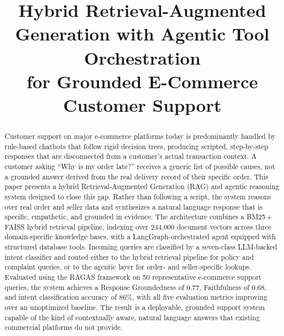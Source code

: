 \documentclass[conference]{IEEEtran}
\begin{document}
\title{Hybrid Retrieval-Augmented Generation with Agentic Tool Orchestration\\
for Grounded E-Commerce Customer Support}

\author{
\and
{}
\and
{}
}

\maketitle

\begin{abstract}
Customer support on major e-commerce platforms today is predominantly handled by
rule-based chatbots that follow rigid decision trees, producing scripted,
step-by-step responses that are disconnected from a customer's actual transaction
context. A customer asking ``Why is my order late?'' receives a generic list of
possible causes, not a grounded answer derived from the real delivery record of
their specific order. This paper presents a hybrid Retrieval-Augmented Generation
(RAG) and agentic reasoning system designed to close this gap. Rather than following
a script, the system reasons over real order and seller data and synthesizes a
natural language response that is specific, empathetic, and grounded in evidence.
The architecture combines a BM25\,+\,FAISS hybrid retrieval pipeline, indexing over
244{,}000 document vectors across three domain-specific knowledge bases, with a
LangGraph-orchestrated agent equipped with structured database tools. Incoming
queries are classified by a seven-class LLM-backed intent classifier and routed
either to the hybrid retrieval pipeline for policy and complaint queries, or to the
agentic layer for order- and seller-specific lookups. Evaluated using the RAGAS
framework on 50 representative e-commerce support queries, the system achieves a
Response Groundedness of 0.77, Faithfulness of 0.68, and intent classification
accuracy of 86\%, with all five evaluation metrics improving over an unoptimized
baseline. The result is a deployable, grounded support system capable of the kind
of contextually aware, natural language answers that existing commercial platforms
do not provide.
\end{abstract}
\end{document}
